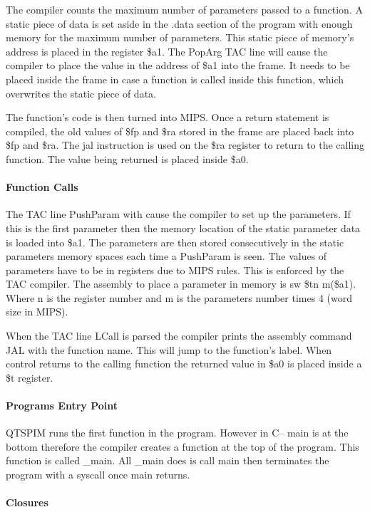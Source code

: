 \documentclass{article}
\begin{document}
	The compiler counts the maximum number of parameters passed to a function. A static piece of data is set aside in the .data section of the program with enough memory for the maximum number of parameters. This static piece of memory's address is placed in the register \$a1. The PopArg TAC line will cause the compiler to place the value in the address of \$a1 into the frame. It needs to be placed inside the frame in case a function is called inside this function, which overwrites the static piece of data.
	
	The function's code is then turned into MIPS. Once a return statement is compiled, the old values of \$fp and \$ra stored in the frame are placed back into \$fp and \$ra. The jal instruction is used on the \$ra register to return to the calling function. The value being returned is placed inside \$a0.
	
	\paragraph{Function Calls}
	
	The TAC line PushParam with cause the compiler to set up the parameters. If this is the first parameter then the memory location of the static parameter data is loaded into \$a1. The parameters are then stored consecutively in the static parameters memory spaces each time a PushParam is seen. The values of parameters have to be in registers due to MIPS rules. This is enforced by the TAC compiler. The assembly to place a parameter in memory is sw \$tn m(\$a1). Where n is the register number and m is the parameters number times 4 (word size in MIPS).
	
	When the TAC line LCall is parsed the compiler prints the assembly command JAL with the function name. This will jump to the function's label. When control returns to the calling function the returned value in \$a0 is placed inside a \$t register. 
	
	\paragraph{Programs Entry Point}
	
	QTSPIM runs the first function in the program. However in C-- main is at the bottom therefore the compiler creates a function at the top of the program. This function is called \_main. All \_main does is call main then terminates the program with a syscall once main returns. 
	
	\paragraph{Closures}
	
\end{document}
